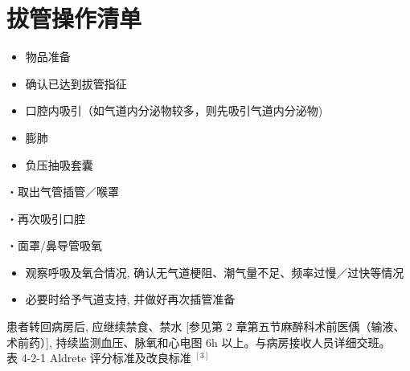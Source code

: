 \documentclass[10pt]{article}
\begin{document}
\section*{拔管操作清单}
\begin{itemize}
  \item 物品准备
  \item 确认已达到拔管指征
  \item 口腔内吸引（如气道内分泌物较多，则先吸引气道内分泌物)
  \item 膨肺
  \item 负压抽吸套囊
\end{itemize}

・取出气管插管／喉罩

・再次吸引口腔

・面罩/鼻导管吸氧

\begin{itemize}
  \item 观察呼吸及氧合情况, 确认无气道梗阻、潮气量不足、频率过慢／过快等情况
  \item 必要时给予气道支持, 并做好再次插管准备
\end{itemize}

患者转回病房后, 应继续禁食、禁水 [参见第 2 章第五节麻醉科术前医偊（输液、术前药）], 持续监测血压、脉氧和心电图 6h 以上。与病房接收人员详细交班。\\
表 4-2-1 Aldrete 评分标准及改良标准 ${ }^{[3]}$
\end{document}
